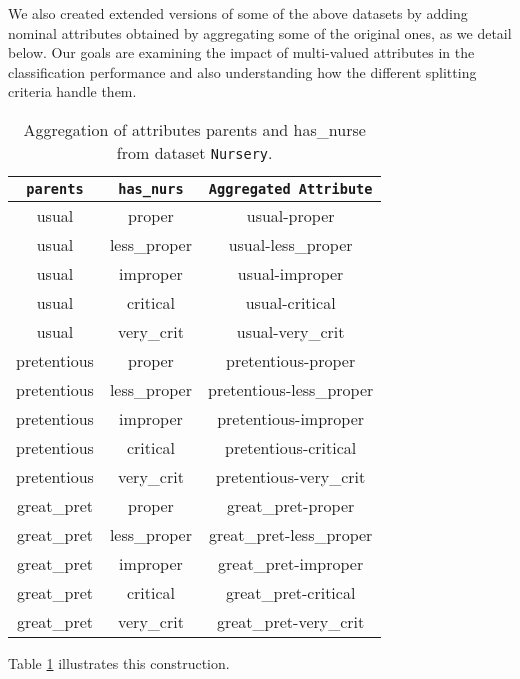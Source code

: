 We also created extended versions
of some of the above datasets 
by adding nominal attributes  obtained by aggregating some of the original ones, as 
we detail below.  
Our goals are  examining the impact of multi-valued
attributes in the classification performance and 
also understanding how the  different 
splitting criteria  handle them.


\begin{table}[]
\centering
\begin{tabular}{c|c|c} 
{\tt parents}     & {\tt has\_nurs}    & {\tt Aggregated Attribute}   \\ \hline
usual       & proper       & usual-proper             \\
usual       & less\_proper & usual-less\_proper       \\
usual       & improper     & usual-improper           \\
usual       & critical     & usual-critical           \\
usual       & very\_crit   & usual-very\_crit         \\
pretentious & proper       & pretentious-proper       \\
pretentious & less\_proper & pretentious-less\_proper \\
pretentious & improper     & pretentious-improper     \\
pretentious & critical     & pretentious-critical     \\
pretentious & very\_crit   & pretentious-very\_crit   \\
great\_pret & proper       & great\_pret-proper       \\
great\_pret & less\_proper & great\_pret-less\_proper \\
great\_pret & improper     & great\_pret-improper     \\
great\_pret & critical     & great\_pret-critical     \\
great\_pret & very\_crit   & great\_pret-very\_crit  
\end{tabular}
\caption{Aggregation of attributes parents and has\_nurse from dataset {\tt Nursery}.}
\label{tab:Aggreation}

\end{table}

Table \ref{tab:Aggreation} illustrates this construction.

